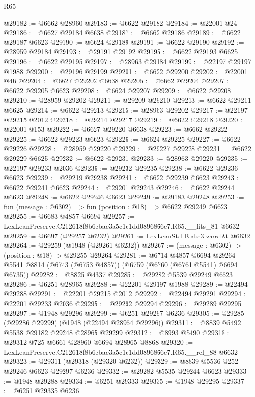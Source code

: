 \begin{lexlean}{R65}
\begin{coremodule}
{@29182 := @6662 @28960
@29183 := @6622 @29182
@29184 := @22001 @24
@29186 := @6627 @29184 @6638
@29187 := @6662 @29186
@29189 := @6622 @29187 @6623
@29190 := @6624 @29189
@29191 := @6622 @29190
@29192 := @28959 @29184
@29193 := @29191 @29192
@29195 := @6622 @29193 @6625
@29196 := @6622 @29195
@29197 := @28963 @29184
@29199 := @22197 @29197 @1988
@29200 := @29196 @29199
@29201 := @6622 @29200
@29202 := @22001 @46
@29204 := @6627 @29202 @6638
@29205 := @6662 @29204
@29207 := @6622 @29205 @6623
@29208 := @6624 @29207
@29209 := @6622 @29208
@29210 := @28959 @29202
@29211 := @29209 @29210
@29213 := @6622 @29211 @6625
@29214 := @6622 @29213
@29215 := @28963 @29202
@29217 := @22197 @29215 @2012
@29218 := @29214 @29217
@29219 := @6622 @29218
@29220 := @22001 @153
@29222 := @6627 @29220 @6638
@29223 := @6662 @29222
@29225 := @6622 @29223 @6623
@29226 := @6624 @29225
@29227 := @6622 @29226
@29228 := @28959 @29220
@29229 := @29227 @29228
@29231 := @6622 @29229 @6625
@29232 := @6622 @29231
@29233 := @28963 @29220
@29235 := @22197 @29233 @2036
@29236 := @29232 @29235
@29238 := @6622 @29236 @6623
@29239 := @29219 @29238
@29241 := @6622 @29239 @6623
@29243 := @6622 @29241 @6623
@29244 := @29201 @29243
@29246 := @6622 @29244 @6623
@29248 := @6622 @29246 @6623
@29249 := @29183 @29248
@29253 := fun (message : @6302) => fun (position : @18) => @6622 @29249 @6623
@29255 := @6683 @4857 @6694
@29257 := LexLeanPreserve.C212618f8b6ebac3a5c1e1dd0896866e7.R65.__fits_81 @6632
@29259 := @6697 (@29257 @6232)
@29261 := LexLeanStd.Blake3.wordAt @6632
@29264 := @29259 (@1948 (@29261 @6232))
@29267 := (message : @6302) -> (position : @18) -> @29255 @29264
@29281 := @6714
    @4857
    @6694
    @29264
    @5541
    @8814
    (@6743 (@6753 @4857))
    (@6759 (@6760 (@6761 @5541) @6694 @6735))
@29282 := @8825 @4337
@29285 := @29282 @5539 @29249 @6623
@29286 := @6251 @28965
@29288 := @22201 @29197 @1988
@29289 := @22494 @29288
@29291 := @22201 @29215 @2012
@29292 := @22494 @29291
@29294 := @22201 @29233 @2036
@29295 := @29292 @29294
@29296 := @29289 @29295
@29297 := @1948 @29296
@29299 := @6251 @29297 @6236
@29305 := @29285 (@29286 @29299) (@1948 (@22494 @28964 @29296))
@29311 := @8839 @5492 @5538 @29182 @29248 @28965 @29299
@29312 := @8993 @5490
@29318 := @29312 @725 @6661 @28960 @6694 @28965 @8868
@29320 := LexLeanPreserve.C212618f8b6ebac3a5c1e1dd0896866e7.R65.__rel_88 @6632
@29323 := @29311 (@29318 (@29320 @6232))
@29329 := @8839 @5536 @252 @29246 @6623 @29297 @6236
@29332 := @29282 @5535 @29244 @6623
@29333 := @1948 @29288
@29334 := @6251 @29333
@29335 := @1948 @29295
@29337 := @6251 @29335 @6236
}
\end{coremodule}
\end{lexlean}
